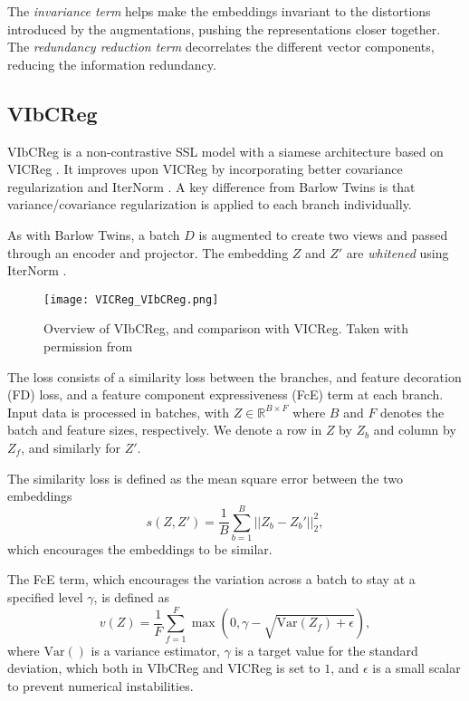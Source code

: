\documentclass[../../thesis.tex]{subfiles}
\begin{document}
The \textit{invariance term} helps make the embeddings invariant to the distortions introduced by the augmentations, pushing the representations closer together. The \textit{redundancy reduction term} decorrelates the different vector components, reducing the information redundancy.\newline

\subsection{VIbCReg}

VIbCReg \cite{lee2024vibcreg} is a non-contrastive SSL model with a siamese architecture based on VICReg \cite{bardes2022vicreg}. It improves upon VICReg by incorporating better covariance regularization and IterNorm \cite{huang2019iterative}. A key difference from Barlow Twins is that variance/covariance regularization is applied to each branch individually.\newline

As with Barlow Twins, a batch $D$ is augmented to create two views and passed through an encoder and projector. The embedding $Z$ and $Z'$ are \textit{whitened}  using IterNorm \cite{huang2019iterative}.\newline

\begin{figure}[h]
    \texttt{[image: VICReg\_VIbCReg.png]}
    \centering    
    \caption{Overview of VIbCReg, and comparison with VICReg. Taken with permission from \cite{lee2024computer}}
    \label{fig:VIbCReg}
\end{figure}

The loss consists of a similarity loss between the branches, and feature decoration (FD) loss, and a feature component expressiveness (FcE) term at each branch. Input data is processed in batches, with $Z \in \mathbb{R}^{B\times F}$ where $B$ and $F$ denotes the batch and feature sizes, respectively. We denote a row in $Z$ by $Z_b$ and column by $Z_f$, and similarly for $Z'$.\newline

The similarity loss is defined as the mean square error between the two embeddings
\begin{equation}
    s(Z,Z') = \frac{1}{B} \sum_{b=1}^B || Z_b-Z_b'||_2^2,
\end{equation}
which encourages the embeddings to be similar.\newline

The FcE term, which encourages the variation across a batch to stay at a specified level $\gamma$, is defined as 
\begin{equation}
    v(Z) =  \frac{1}{F} \sum_{f=1}^F \max(0,\gamma - \sqrt{\text{Var}(Z_f)+\epsilon}),
\end{equation}
where $\text{Var}()$ is a variance estimator, $\gamma$ is a target value for the standard deviation, which both in VIbCReg and VICReg is set to $1$, and $\epsilon$ is a small scalar to prevent numerical instabilities. 
\newline 
\end{document}
